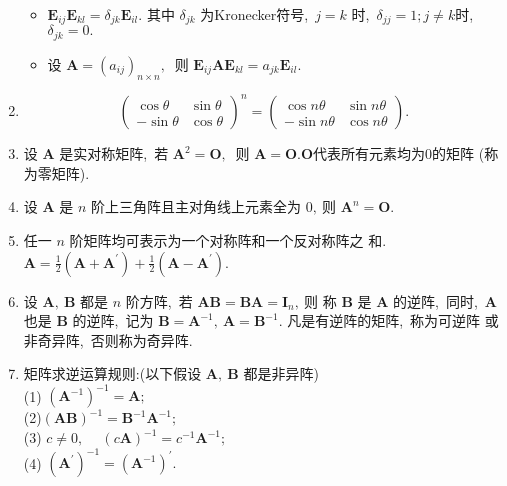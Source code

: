 \begin{enumerate}
		\begin{itemize}
			\item  $\boldsymbol{E}_{i j} \boldsymbol{E}_{k l}=\delta_{j k} \boldsymbol{E}_{i l} .$ 其中  $\delta_{j k} $ 为Kronecker符号,\   $j=k$  时,\   $\delta_{j j}=1 ; j \neq k  $时,\  $ \delta_{j k}=0 .$
			\item 设 $ \boldsymbol{A}=\left(a_{i j}\right)_{n \times n} ,\ $ 则  $\boldsymbol{E}_{i j} \boldsymbol{A} \boldsymbol{E}_{k l}=a_{j k} \boldsymbol{E}_{i l} .$
		\end{itemize}
		\item $$\left(\begin{array}{cc}\cos \theta & \sin \theta \\ -\sin \theta & \cos \theta\end{array}\right)^{n}=\left(\begin{array}{cc}\cos n \theta & \sin n \theta \\ -\sin n \theta & \cos n \theta\end{array}\right) .$$
		\item 设  $\boldsymbol{A}$  是实对称矩阵,\  若  $\boldsymbol{A}^{2}=\boldsymbol{O} ,\ $ 则  $\boldsymbol{A}=\boldsymbol{O} .  \boldsymbol{O}  $代表所有元素均为$ 0 $的矩阵 (称为零矩阵).
		\item 设  $\boldsymbol{A}$  是 $ n $ 阶上三角阵且主对角线上元素全为 $0 ,\  $则  $\boldsymbol{A}^{n}=\boldsymbol{O} .$
		\item 任一  $n$  阶矩阵均可表示为一个对称阵和一个反对称阵之 和.  $\boldsymbol{A}=\frac{1}{2}\left(\boldsymbol{A}+\boldsymbol{A}^{\prime}\right)+\frac{1}{2}\left(\boldsymbol{A}-\boldsymbol{A}^{\prime}\right) .$
		\item 设 $ \boldsymbol{A},\  \boldsymbol{B} $ 都是 $ n $ 阶方阵,\  若  $\boldsymbol{A B}=\boldsymbol{B A}=\boldsymbol{I}_{n} ,\  $则 称 $ \boldsymbol{B} $ 是 $ \boldsymbol{A} $ 的逆阵,\  同时,\  $ \boldsymbol{A}$  也是 $ \boldsymbol{B} $ 的逆阵,\  记为 $ \boldsymbol{B}=\boldsymbol{A}^{-1},\  \boldsymbol{A}=\boldsymbol{B}^{-1} .$ 凡是有逆阵的矩阵,\  称为可逆阵 或非奇异阵,\  否则称为奇异阵.
		\item 矩阵求逆运算规则:(以下假设 $ \boldsymbol{A},\  \boldsymbol{B} $ 都是非异阵)\\ 
		(1) $ \left(\boldsymbol{A}^{-1}\right)^{-1}=\boldsymbol{A} ;$\\
		(2)$  (\boldsymbol{A B})^{-1}=\boldsymbol{B}^{-1} \boldsymbol{A}^{-1} ;$\\
		(3) $ c \neq 0,\  \quad(c \boldsymbol{A})^{-1}=c^{-1} \boldsymbol{A}^{-1} ;$\\
		(4)  $\left(\boldsymbol{A}^{\prime}\right)^{-1}=\left(\boldsymbol{A}^{-1}\right)^{\prime} .$
		

\end{enumerate}

